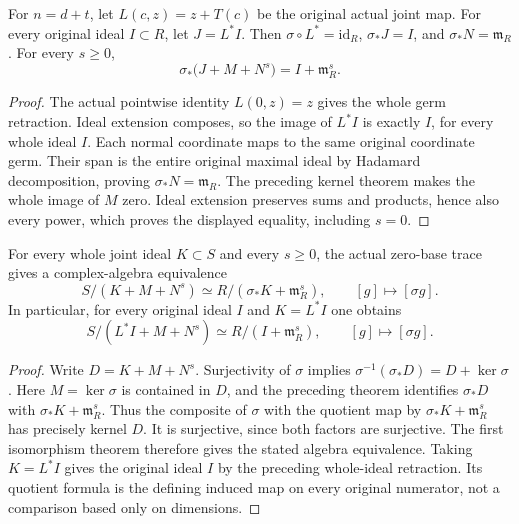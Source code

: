 \begin{theorem}
\label{hir:actual-joint-base-fibre-original-ideals}
\leanok
{}
For $n=d+t$, let $L(c,z)=z+T(c)$ be the original actual joint map.
For every original ideal $I\subset R$, let $J=L^*I$. Then
$\sigma\circ L^*=\mathrm{id}_R$, $\sigma_*J=I$, and
$\sigma_*N=\mathfrak m_R$. For every $s\geq0$,
\[
 \sigma_*\bigl(J+M+N^s\bigr)=I+\mathfrak m_R^s.
\]
\end{theorem}
\begin{proof}
The actual pointwise identity $L(0,z)=z$ gives the whole germ retraction.
Ideal extension composes, so the image of $L^*I$ is exactly $I$, for
every whole ideal $I$. Each normal coordinate maps to the same original
coordinate germ. Their span is the entire original maximal ideal by
Hadamard decomposition, proving $\sigma_*N=\mathfrak m_R$.
The preceding kernel theorem makes the whole image of $M$ zero.
Ideal extension preserves sums and products, hence also every power,
which proves the displayed equality, including $s=0$.
\end{proof}

\begin{theorem}
\label{hir:actual-joint-base-fibre-truncation-dictionary}
\leanok
{}
For every whole joint ideal $K\subset S$ and every $s\geq0$, the
actual zero-base trace gives a complex-algebra equivalence
\[
 S/(K+M+N^s)\simeq R/(\sigma_*K+\mathfrak m_R^s),\qquad
 [g]\longmapsto[\sigma g].
\]
In particular, for every original ideal $I$ and $K=L^*I$ one obtains
\[
 S/(L^*I+M+N^s)\simeq R/(I+\mathfrak m_R^s),\qquad
 [g]\longmapsto[\sigma g].
\]
\end{theorem}
\begin{proof}
Write $D=K+M+N^s$. Surjectivity of $\sigma$ implies
$\sigma^{-1}(\sigma_*D)=D+\ker\sigma$. Here $M=\ker\sigma$ is
contained in $D$, and the preceding theorem identifies $\sigma_*D$
with $\sigma_*K+\mathfrak m_R^s$. Thus the composite of $\sigma$ with the
quotient map by $\sigma_*K+\mathfrak m_R^s$ has precisely kernel $D$.
It is surjective, since both factors are surjective. The first
isomorphism theorem therefore gives the stated algebra equivalence. Taking $K=L^*I$ gives the
original ideal $I$ by the preceding whole-ideal retraction.
Its quotient formula is the defining induced map on every original
numerator, not a comparison based only on dimensions.
\end{proof}

